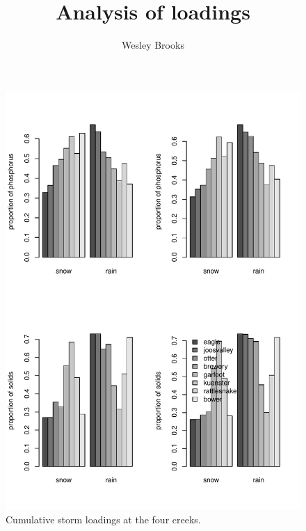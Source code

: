 \documentclass[10pt]{article}
\title{Analysis of loadings}
\author{Wesley Brooks}
\date{}                                           %
\begin{document}
\maketitle




















\begin{figure}[h!]
    \begin{center}
\includegraphics{loadings-fig2}
    \end{center}
    \vspace{-10mm}
    \caption{Cumulative storm loadings at the four creeks.\label{bars}}
\end{figure}
\end{document}
